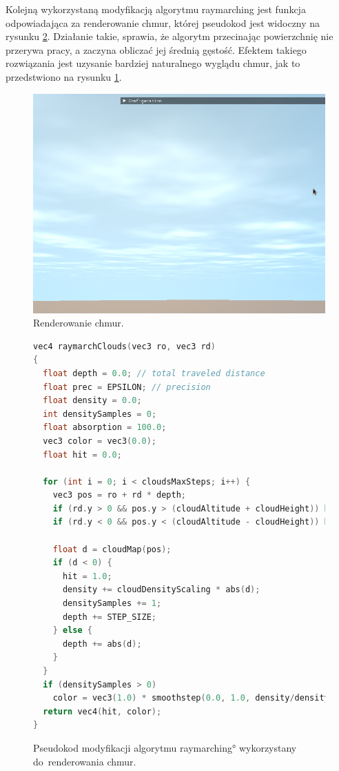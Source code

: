 Kolejną wykorzystaną modyfikacją algorytmu raymarching jest funkcja odpowiadająca za renderowanie chmur, której pseudokod jest widoczny na rysunku \ref{fig:pseudokod:cloud}. Działanie takie, sprawia, że algorytm przecinając powierzchnię nie przerywa pracy, a zaczyna obliczać jej średnią gęstość. Efektem takiego rozwiązania jest uzysanie bardziej naturalnego wyglądu chmur, jak to przedstwiono na rysunku \ref{fig:clouds}.

\begin{figure}[H]
\centering
\includegraphics[width=1\textwidth]{./graf/clouds.png}
\caption{Renderowanie chmur.}
\label{fig:clouds}
\end{figure}

\begin{figure}[H]
\centering
\begin{lstlisting}[language=C]
vec4 raymarchClouds(vec3 ro, vec3 rd)
{
  float depth = 0.0; // total traveled distance
  float prec = EPSILON; // precision
  float density = 0.0;
  int densitySamples = 0;
  float absorption = 100.0;
  vec3 color = vec3(0.0);
  float hit = 0.0;

  for (int i = 0; i < cloudsMaxSteps; i++) {
    vec3 pos = ro + rd * depth;
    if (rd.y > 0 && pos.y > (cloudAltitude + cloudHeight)) break;
    if (rd.y < 0 && pos.y < (cloudAltitude - cloudHeight)) break;

    float d = cloudMap(pos);
    if (d < 0) {
      hit = 1.0;
      density += cloudDensityScaling * abs(d);
      densitySamples += 1;
      depth += STEP_SIZE;
    } else {
      depth += abs(d);
    }
  }
  if (densitySamples > 0)
    color = vec3(1.0) * smoothstep(0.0, 1.0, density/densitySamples);
  return vec4(hit, color);
}
\end{lstlisting}
\caption{Pseudokod modyfikacji algorytmu \ang{raymarching} wykorzystany do~renderowania chmur.}
\label{fig:pseudokod:cloud}
\end{figure}







